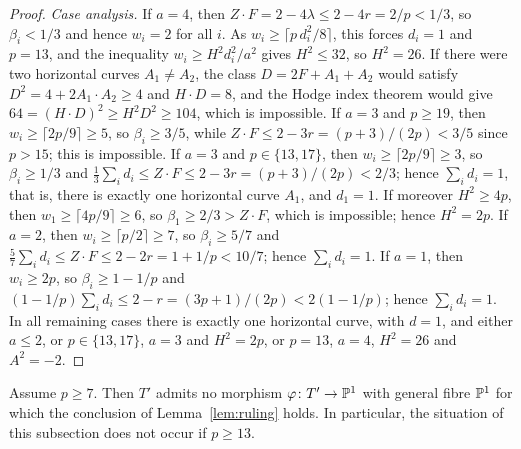 \begin{proof}
\emph{Case analysis.}
If $a = 4$, then $Z\cdot F = 2-4\lambda\leq 2-4r = 2/p<1/3$, so $\beta_i<1/3$ and hence $w_i = 2$ for all $i$.
As $w_i\geq\lceil p\,d_i^2/8\rceil$, this forces $d_i = 1$ and $p = 13$, and the inequality $w_i\geq H^2d_i^2/a^2$ gives $H^2\leq 32$, so $H^2 = 26$.
If there were two horizontal curves $A_1\neq A_2$, the class $D = 2F+A_1+A_2$ would satisfy $D^2 = 4+2A_1\cdot A_2\geq 4$ and $H\cdot D = 8$, and the Hodge index theorem would give $64 = (H\cdot D)^2\geq H^2D^2\geq 104$, which is impossible.
If $a = 3$ and $p\geq 19$, then $w_i\geq\lceil 2p/9\rceil\geq 5$, so $\beta_i\geq 3/5$, while $Z\cdot F\leq 2-3r = (p+3)/(2p)<3/5$ since $p>15$; this is impossible.
If $a = 3$ and $p\in\{13,17\}$, then $w_i\geq\lceil 2p/9\rceil\geq 3$, so $\beta_i\geq 1/3$ and $\tfrac13\sum_id_i\leq Z\cdot F\leq 2-3r = (p+3)/(2p)<2/3$; hence $\sum_id_i = 1$, that is, there is exactly one horizontal curve $A_1$, and $d_1 = 1$.
If moreover $H^2\geq 4p$, then $w_1\geq\lceil 4p/9\rceil\geq 6$, so $\beta_1\geq 2/3>Z\cdot F$, which is impossible; hence $H^2 = 2p$.
If $a = 2$, then $w_i\geq\lceil p/2\rceil\geq 7$, so $\beta_i\geq 5/7$ and $\tfrac57\sum_id_i\leq Z\cdot F\leq 2-2r = 1+1/p<10/7$; hence $\sum_id_i = 1$.
If $a = 1$, then $w_i\geq 2p$, so $\beta_i\geq 1-1/p$ and $(1-1/p)\sum_id_i\leq 2-r = (3p+1)/(2p)<2(1-1/p)$; hence $\sum_id_i = 1$.
In all remaining cases there is exactly one horizontal curve, with $d = 1$, and either $a\leq 2$, or $p\in\{13,17\}$, $a = 3$ and $H^2 = 2p$, or $p = 13$, $a = 4$, $H^2 = 26$ and $A^2 = -2$.
\end{proof}

\begin{proposition}\label{prop:rank-one}
Assume $p\geq 7$.
Then $T'$ admits no morphism $\varphi\colon T'\to\mathbb{P}^1$ with general fibre $\mathbb{P}^1$ for which the conclusion of Lemma~\textup{\ref{lem:ruling}} holds.
In particular, the situation of this subsection does not occur if $p\geq 13$.
\end{proposition}

